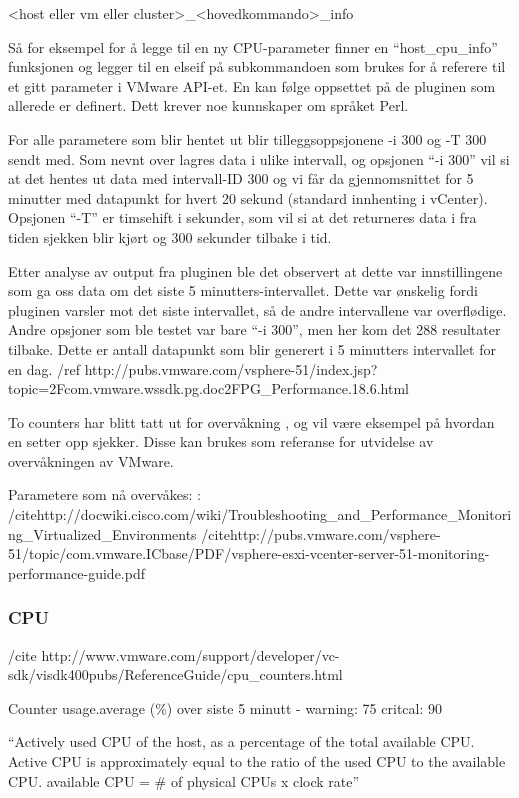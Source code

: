<host eller vm eller cluster>\_<hovedkommando>\_info 

Så for eksempel for å legge til en ny CPU-parameter finner en “host\_cpu\_info” funksjonen og legger til en elseif på subkommandoen som brukes for å referere til et gitt parameter i VMware API-et. En kan følge oppsettet på de pluginen som allerede er definert. Dett krever noe kunnskaper om språket Perl.

For alle parametere som blir hentet ut blir tilleggsoppsjonene -i 300 og -T 300 sendt med.
Som nevnt over lagres data i ulike intervall, og opsjonen “-i 300” vil si at det hentes ut data med intervall-ID 300 og vi får da gjennomsnittet for 5 minutter med datapunkt for hvert 20 sekund (standard innhenting i vCenter). Opsjonen “-T” er timsehift i sekunder, som vil si at det returneres data i fra tiden sjekken blir kjørt og 300 sekunder tilbake i tid. 

Etter analyse av output fra pluginen ble det observert at dette var innstillingene som ga oss data om det siste 5 minutters-intervallet. Dette var ønskelig fordi pluginen varsler mot det siste intervallet, så de andre intervallene var overflødige. Andre opsjoner som ble testet var bare “-i 300”, men her kom det 288 resultater tilbake. Dette er antall datapunkt som blir generert i 5 minutters intervallet for en dag. /ref http://pubs.vmware.com/vsphere-51/index.jsp?topic=2Fcom.vmware.wssdk.pg.doc2FPG\_Performance.18.6.html

To counters har blitt tatt ut for overvåkning , og vil være eksempel på hvordan en setter opp sjekker. Disse kan brukes som referanse for utvidelse av overvåkningen av VMware. 

 Parametere som nå overvåkes: : 
/citehttp://docwiki.cisco.com/wiki/Troubleshooting\_and\_Performance\_Monitoring\_Virtualized\_Environments
/citehttp://pubs.vmware.com/vsphere-51/topic/com.vmware.ICbase/PDF/vsphere-esxi-vcenter-server-51-monitoring-performance-guide.pdf

\subsubsection*{CPU}

/cite http://www.vmware.com/support/developer/vc-sdk/visdk400pubs/ReferenceGuide/cpu\_counters.html


Counter usage.average (\%) over siste 5 minutt -  warning: 75 critcal: 90 

``Actively used CPU of the host, as a percentage of the total available CPU. Active CPU is approximately equal to the ratio of the used CPU to the available CPU. available CPU = \# of physical CPUs x clock rate''

